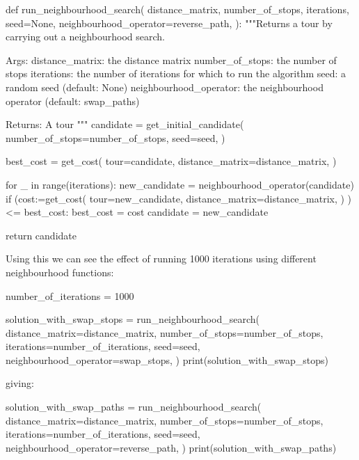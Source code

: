 \begin{pyin}
def run_neighbourhood_search(
    distance_matrix,
    number_of_stops,
    iterations,
    seed=None,
    neighbourhood_operator=reverse_path,
):
    """Returns a tour by carrying out a neighbourhood search.

    Args:
        distance_matrix: the distance matrix
        number_of_stops: the number of stops
        iterations: the number of iterations for which to
                    run the algorithm
        seed: a random seed (default: None)
        neighbourhood_operator: the neighbourhood operator
                                (default: swap_paths)

    Returns:
        A tour
    """
    candidate = get_initial_candidate(
        number_of_stops=number_of_stops,
        seed=seed,
    )

    best_cost = get_cost(
        tour=candidate,
        distance_matrix=distance_matrix,
    )

    for _ in range(iterations):
        new_candidate = neighbourhood_operator(candidate)
        if (cost:=get_cost(
                    tour=new_candidate,
                    distance_matrix=distance_matrix,
                  )
            ) <= best_cost:
            best_cost = cost
            candidate = new_candidate

    return candidate
\end{pyin}

Using this we can see the effect of running 1000 iterations using different
neighbourhood functions:


\begin{pyin}
number_of_iterations = 1000

solution_with_swap_stops = run_neighbourhood_search(
    distance_matrix=distance_matrix,
    number_of_stops=number_of_stops,
    iterations=number_of_iterations,
    seed=seed,
    neighbourhood_operator=swap_stops,
)
print(solution_with_swap_stops)
\end{pyin}

giving:

\begin{pyout}
[0, 7, 2, 8, 5, 3, 1, 9, 12, 11, 4, 10, 6, 0]
\end{pyout}

\begin{pyin}
solution_with_swap_paths = run_neighbourhood_search(
    distance_matrix=distance_matrix,
    number_of_stops=number_of_stops,
    iterations=number_of_iterations,
    seed=seed,
    neighbourhood_operator=reverse_path,
)
print(solution_with_swap_paths)
\end{pyin}


